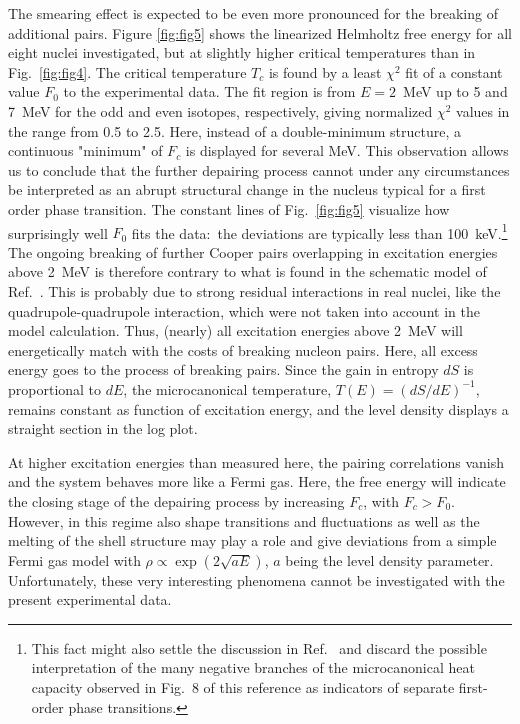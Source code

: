 \begin{multicols}{2}
The smearing effect is expected to be even more pronounced for the breaking of
additional pairs. Figure \ref{fig:fig5} shows the linearized Helmholtz free 
energy for all eight nuclei investigated, but at slightly higher critical 
temperatures than in Fig.\ \ref{fig:fig4}. The critical temperature $T_c$ is 
found by a least $\chi^2$ fit of a constant value $F_0$ to the experimental 
data. The fit region is from $E=2$~MeV up to 5 and 7~MeV for the odd and even 
isotopes, respectively, giving normalized $\chi^2$ values in the range from 0.5
to 2.5. Here, instead of a double-minimum structure, a continuous "minimum" of 
$F_c$ is displayed for several MeV\@. This observation allows us to conclude 
that the further depairing process cannot under any circumstances be 
interpreted as an abrupt structural change in the nucleus typical for a first 
order phase transition. The constant lines of Fig.\ \ref{fig:fig5} visualize 
how surprisingly well $F_0$ fits the data:\ the deviations are typically less 
than 100~keV\@.\footnote{This fact might also settle the discussion in Ref.\ 
\cite{MG01} and discard the possible interpretation of the many negative 
branches of the microcanonical heat capacity observed in Fig.\ 8 of this 
reference as indicators of separate first-order phase transitions.} The ongoing
breaking of further Cooper pairs overlapping in excitation energies above 2~MeV
is therefore contrary to what is found in the schematic model of Ref.\ 
\cite{BD01}. This is probably due to strong residual interactions in real 
nuclei, like the quadrupole-quadrupole interaction, which were not taken into 
account in the model calculation. Thus, (nearly) all excitation energies above 
2~MeV will energetically match with the costs of breaking nucleon pairs. Here, 
all excess energy goes to the process of breaking pairs. Since the gain in 
entropy $dS$ is proportional to $dE$, the microcanonical temperature, 
$T(E)=(dS/dE)^{-1}$, remains constant as function of excitation energy, and the
level density displays a straight section in the log plot.

At higher excitation energies than measured here, the pairing correlations 
vanish and the system behaves more like a Fermi gas. Here, the free energy will
indicate the closing stage of the depairing process by increasing $F_c$, with 
$F_c>F_0$. However, in this regime also shape transitions and fluctuations as 
well as the melting of the shell structure may play a role and give deviations 
from a simple Fermi gas model with $\rho\propto\exp(2\sqrt{aE})$, $a$ being the
level density parameter. Unfortunately, these very interesting phenomena cannot
be investigated with the present experimental data.


\end{multicols}
